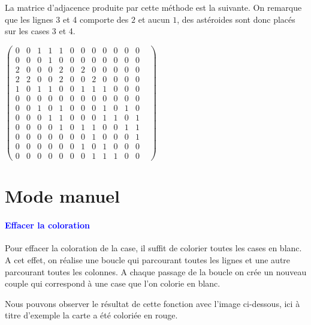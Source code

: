 \documentclass{report}
\begin{document}
			La matrice d'adjacence produite par cette méthode est la suivante. On remarque que les lignes 3 et 4 comporte des $2$ et aucun $1$, des astéroides sont donc placés sur les cases 3 et 4.
			\setcounter{MaxMatrixCols}{20}
			\\
			\begin{center}
			$\begin{pmatrix}
			0&0&1&1&1&0&0&0&0&0&0&0&\\
			0&0&0&1&0&0&0&0&0&0&0&0&\\
			2&0&0&0&2&0&2&0&0&0&0&0&\\
			2&2&0&0&2&0&0&2&0&0&0&0&\\
			1&0&1&1&0&0&1&1&1&0&0&0&\\
			0&0&0&0&0&0&0&0&0&0&0&0&\\
			0&0&1&0&1&0&0&0&1&0&1&0&\\
			0&0&0&1&1&0&0&0&1&1&0&1&\\
			0&0&0&0&1&0&1&1&0&0&1&1&\\
			0&0&0&0&0&0&0&1&0&0&0&1&\\
			0&0&0&0&0&0&1&0&1&0&0&0&\\
			0&0&0&0&0&0&0&1&1&1&0&0&
			\end{pmatrix}$	
			\end{center}
			
		\section{Mode manuel}
			      \paragraph{\textcolor{blue}{Effacer la coloration}} 
    Pour effacer la coloration de la case, il suffit de colorier toutes les cases en blanc. 
    A cet effet, on réalise une boucle qui parcourant toutes les lignes  et une autre parcourant toutes les colonnes. A chaque passage de la boucle on crée un nouveau couple qui correspond à une case que l'on colorie en blanc. %
       
      Nous pouvons observer le résultat de cette fonction avec l'image ci-dessous, ici à titre d'exemple la carte a été coloriée en rouge.
       
\end{document}
